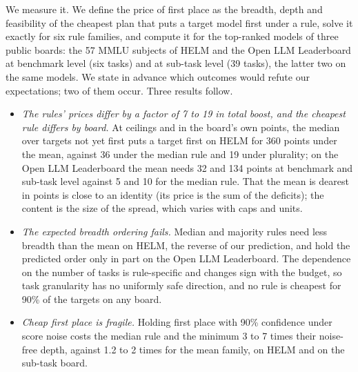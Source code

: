 We measure it. We define the price of first place as the breadth, depth and feasibility of the cheapest plan that puts a target model first under a rule, solve it exactly for six rule families, and compute it for the top-ranked models of three public boards: the 57 MMLU subjects of HELM and the Open LLM Leaderboard at benchmark level (six tasks) and at sub-task level (39 tasks), the latter two on the same models. We state in advance which outcomes would refute our expectations; two of them occur. Three results follow.
\begin{itemize}
\item \emph{The rules' prices differ by a factor of 7 to 19 in total boost, and the cheapest rule differs by board.} At ceilings and in the board's own points, the median over targets not yet first puts a target first on HELM for 360 points under the mean, against 36 under the median rule and 19 under plurality; on the Open LLM Leaderboard the mean needs 32 and 134 points at benchmark and sub-task level against 5 and 10 for the median rule. That the mean is dearest in points is close to an identity (its price is the sum of the deficits); the content is the size of the spread, which varies with caps and units.
\item \emph{The expected breadth ordering fails.} Median and majority rules need less breadth than the mean on HELM, the reverse of our prediction, and hold the predicted order only in part on the Open LLM Leaderboard. The dependence on the number of tasks is rule-specific and changes sign with the budget, so task granularity has no uniformly safe direction, and no rule is cheapest for 90\% of the targets on any board.
\item \emph{Cheap first place is fragile.} Holding first place with 90\% confidence under score noise costs the median rule and the minimum 3 to 7 times their noise-free depth, against 1.2 to 2 times for the mean family, on HELM and on the sub-task board.
\end{itemize}

